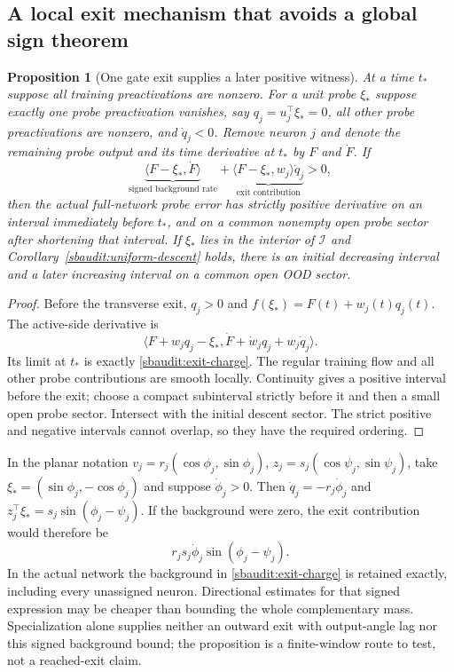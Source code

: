 \documentclass[11pt]{article}
\newtheorem{proposition}[theorem]{Proposition}
\theoremstyle{remark}
\begin{document}
\subsection{A local exit mechanism that avoids a global sign theorem}

\begin{proposition}[One gate exit supplies a later positive witness]
\label{sbaudit:exit-witness}
At a time $t_*$ suppose all training preactivations are nonzero. For a
unit probe $\xi_*$ suppose exactly one probe preactivation vanishes,
say $q_j=u_j^\top\xi_*=0$, all other probe preactivations are nonzero,
and $\dot q_j<0$. Remove neuron $j$ and denote the remaining probe
output and its time derivative at $t_*$ by $F$ and $\dot F$.
If
\begin{equation}\label{sbaudit:exit-charge}
 \underbrace{\langle F-\xi_*,\dot F\rangle}_{\text{signed background rate}}
 +\underbrace{\langle F-\xi_*,w_j\rangle\dot q_j}_{\text{exit contribution}}
 >0,
\end{equation}
then the actual full-network probe error has strictly positive derivative
on an interval immediately before $t_*$, and on a common nonempty open
probe sector after shortening that interval.
If $\xi_*$ lies in the interior of $\mathcal I$ and
Corollary~\ref{sbaudit:uniform-descent} holds, there is an initial decreasing
interval and a later increasing interval on a common open OOD sector.
\end{proposition}
\begin{proof}
Before the transverse exit, $q_j>0$ and
$f(\xi_*)=F(t)+w_j(t)q_j(t)$. The active-side derivative is
\[
 \langle F+w_jq_j-\xi_*,
       \dot F+\dot w_jq_j+w_j\dot q_j\rangle.
\]
Its limit at $t_*$ is exactly \eqref{sbaudit:exit-charge}. The regular
training flow and all other probe contributions are smooth locally.
Continuity gives a positive interval before the exit; choose a compact
subinterval strictly before it and then a small open probe sector.
Intersect with the initial descent sector. The strict positive and
negative intervals cannot overlap, so they have the required ordering.
\end{proof}

In the planar notation $v_j=r_j(\cos\phi_j,\sin\phi_j)$,
$z_j=s_j(\cos\psi_j,\sin\psi_j)$, take
$\xi_*=(\sin\phi_j,-\cos\phi_j)$ and suppose $\dot\phi_j>0$.
Then $\dot q_j=-r_j\dot\phi_j$ and
$z_j^\top\xi_*=s_j\sin(\phi_j-\psi_j)$.
If the background were zero, the exit contribution would therefore be
\begin{equation}\label{sbaudit:angular-exit}
 r_js_j\dot\phi_j\sin(\phi_j-\psi_j).
\end{equation}
In the actual network the background in \eqref{sbaudit:exit-charge}
is retained exactly, including every unassigned neuron. Directional
estimates for that signed expression may be cheaper than bounding the
whole complementary mass. Specialization alone supplies neither an
outward exit with output-angle lag nor this signed background bound;
the proposition is a finite-window route to test, not a reached-exit
claim.
\end{document}
